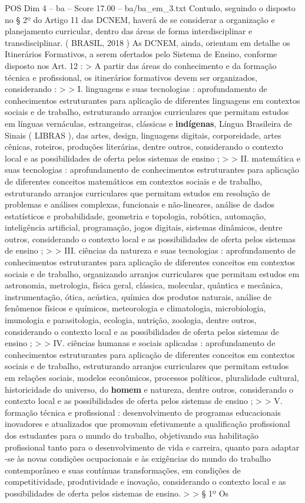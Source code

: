 \begin{textsample}{POS Dim 4 – ba – Score 17.00 – ba/ba\_em\_3.txt}
Contudo, seguindo o disposto no § 2º do Artigo 11 das DCNEM, haverá de se considerar a organização e planejamento curricular, dentro das áreas de forma interdisciplinar e transdisciplinar. ( BRASIL, 2018 ) As DCNEM, ainda, orientam em detalhe os Itinerários Formativos, a serem ofertados pelo Sistema de Ensino, conforme disposto nos Art. 12 : > A partir das áreas do conhecimento e da formação técnica e profissional, os itinerários formativos devem ser organizados, considerando : > > I. linguagens e suas tecnologias : aprofundamento de conhecimentos estruturantes para aplicação de diferentes linguagens em contextos sociais e de trabalho, estruturando arranjos curriculares que permitam estudos em línguas vernáculas, estrangeiras, clássicas e \textbf{indígenas}, Língua Brasileira de Sinais ( LIBRAS ), das artes, design, linguagens digitais, corporeidade, artes cênicas, roteiros, produções literárias, dentre outros, considerando o contexto local e as possibilidades de oferta pelos sistemas de ensino ; > > II. matemática e suas tecnologias : aprofundamento de conhecimentos estruturantes para aplicação de diferentes conceitos matemáticos em contextos sociais e de trabalho, estruturando arranjos curriculares que permitam estudos em resolução de problemas e análises complexas, funcionais e não-lineares, análise de dados estatísticos e probabilidade, geometria e topologia, robótica, automação, inteligência artificial, programação, jogos digitais, sistemas dinâmicos, dentre outros, considerando o contexto local e as possibilidades de oferta pelos sistemas de ensino ; > > III. ciências da natureza e suas tecnologias : aprofundamento de conhecimentos estruturantes para aplicação de diferentes conceitos em contextos sociais e de trabalho, organizando arranjos curriculares que permitam estudos em astronomia, metrologia, física geral, clássica, molecular, quântica e mecânica, instrumentação, ótica, acústica, química dos produtos naturais, análise de fenômenos físicos e químicos, meteorologia e climatologia, microbiologia, imunologia e parasitologia, ecologia, nutrição, zoologia, dentre outros, considerando o contexto local e as possibilidades de oferta pelos sistemas de ensino ; > > IV. ciências humanas e sociais aplicadas : aprofundamento de conhecimentos estruturantes para aplicação de diferentes conceitos em contextos sociais e de trabalho, estruturando arranjos curriculares que permitam estudos em relações sociais, modelos econômicos, processos políticos, pluralidade cultural, historicidade do universo, do \textbf{homem} e natureza, dentre outros, considerando o contexto local e as possibilidades de oferta pelos sistemas de ensino ; > > V. formação técnica e profissional : desenvolvimento de programas educacionais inovadores e atualizados que promovam efetivamente a qualificação profissional dos estudantes para o mundo do trabalho, objetivando sua habilitação profissional tanto para o desenvolvimento de vida e carreira, quanto para adaptar -se às novas condições ocupacionais e às exigências do mundo do trabalho contemporâneo e suas contínuas transformações, em condições de competitividade, produtividade e inovação, considerando o contexto local e as possibilidades de oferta pelos sistemas de ensino. > > § 1º Os 
\end{textsample}

